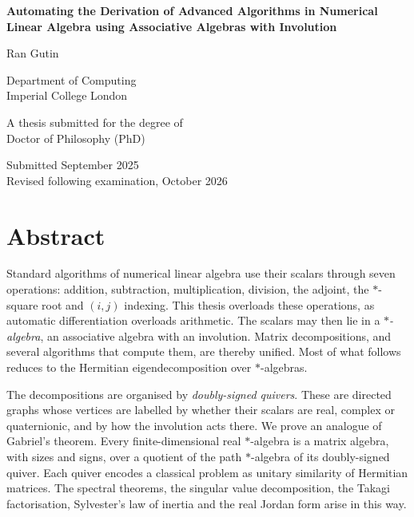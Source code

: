 \documentclass[12pt, a4paper]{report}
\theoremstyle{plain}
\theoremstyle{definition}
\theoremstyle{remark}
\theoremstyle{plain}
\begin{document}
\begin{titlepage}
\centering
\vspace*{1.5cm}
{\LARGE\bfseries Automating the Derivation of Advanced Algorithms in Numerical Linear Algebra using Associative Algebras with Involution\par}
\vspace{2.5cm}
{\Large Ran Gutin\par}
\vspace{2.5cm}
{\large Department of Computing\\[1ex] Imperial College London\par}
\vspace{2.5cm}
{\large A thesis submitted for the degree of\\[1ex] Doctor of Philosophy (PhD)\par}
\vfill
{Submitted September 2025\\[1ex] Revised following examination, October 2026\par}
\end{titlepage}
\setcounter{page}{2} %

\chapter*{Abstract}
Standard algorithms of numerical linear algebra use their scalars through seven operations: addition, subtraction, multiplication, division, the adjoint, the $*$-square root and $(i,j)$ indexing. This thesis overloads these operations, as automatic differentiation overloads arithmetic. The scalars may then lie in a \emph{$*$-algebra}, an associative algebra with an involution. Matrix decompositions, and several algorithms that compute them, are thereby unified. Most of what follows reduces to the Hermitian eigendecomposition over $*$-algebras.

The decompositions are organised by \emph{doubly-signed quivers}. These are directed graphs whose vertices are labelled by whether their scalars are real, complex or quaternionic, and by how the involution acts there. We prove an analogue of Gabriel's theorem. Every finite-dimensional real $*$-algebra is a matrix algebra, with sizes and signs, over a quotient of the path $*$-algebra of its doubly-signed quiver. Each quiver encodes a classical problem as unitary similarity of Hermitian matrices. The spectral theorems, the singular value decomposition, the Takagi factorisation, Sylvester's law of inertia and the real Jordan form arise in this way.
\end{document}
